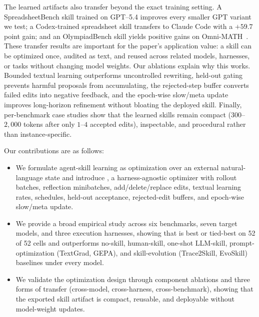 The learned artifacts also transfer beyond the exact training setting. A SpreadsheetBench skill trained on GPT--5.4 improves every smaller GPT variant we test; a Codex-trained spreadsheet skill transfers to Claude Code with a $+59.7$ point gain; and an OlympiadBench skill yields positive gains on Omni-MATH~\citep{gao2024omnimathuniversalolympiadlevel}. These transfer results are important for the paper's application value: a skill can be optimized once, audited as text, and reused across related models, harnesses, or tasks without changing model weights. Our ablations explain why this works. Bounded textual learning outperforms uncontrolled rewriting, held-out gating prevents harmful proposals from accumulating, the rejected-step buffer converts failed edits into negative feedback, and the epoch-wise slow/meta update improves long-horizon refinement without bloating the deployed skill. Finally, per-benchmark case studies show that the learned skills remain compact ($300$--$2{,}000$ tokens after only $1$--$4$ accepted edits), inspectable, and procedural rather than instance-specific.

Our contributions are as follows:
\begin{itemize}
    \item We formulate agent-skill learning as optimization over an external natural-language state and introduce \ourmethod{}, a harness-agnostic optimizer with rollout batches, reflection minibatches, add/delete/replace edits, textual learning rates, schedules, held-out acceptance, rejected-edit buffers, and epoch-wise slow/meta update.
    \item We provide a broad empirical study across six benchmarks, seven target models, and three execution harnesses, showing that \ourmethod{} is best or tied-best on 52 of 52 cells and outperforms no-skill, human-skill, one-shot LLM-skill, prompt-optimization (TextGrad, GEPA), and skill-evolution (Trace2Skill, EvoSkill) baselines under every model.
    \item We validate the optimization design through component ablations and three forms of transfer (cross-model, cross-harness, cross-benchmark), showing that the exported skill artifact is compact, reusable, and deployable without model-weight updates.
\end{itemize}
